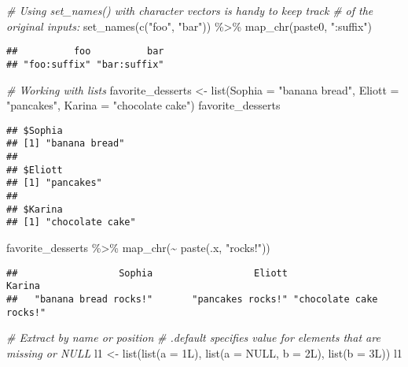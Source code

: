 \documentclass[
]{book}
\newenvironment{Shaded}{\begin{snugshade}}{\end{snugshade}}
\newcommand{\AttributeTok}[1]{\textcolor[rgb]{0.77,0.63,0.00}{#1}}
\newcommand{\CommentTok}[1]{\textcolor[rgb]{0.56,0.35,0.01}{\textit{#1}}}
\newcommand{\ConstantTok}[1]{\textcolor[rgb]{0.00,0.00,0.00}{#1}}
\newcommand{\FunctionTok}[1]{\textcolor[rgb]{0.00,0.00,0.00}{#1}}
\newcommand{\NormalTok}[1]{#1}
\newcommand{\OtherTok}[1]{\textcolor[rgb]{0.56,0.35,0.01}{#1}}
\newcommand{\SpecialCharTok}[1]{\textcolor[rgb]{0.00,0.00,0.00}{#1}}
\newcommand{\StringTok}[1]{\textcolor[rgb]{0.31,0.60,0.02}{#1}}
\begin{document}
\begin{Shaded}
\begin{Highlighting}[]
\CommentTok{\# Using set\_names() with character vectors is handy to keep track}
\CommentTok{\# of the original inputs:}
\FunctionTok{set\_names}\NormalTok{(}\FunctionTok{c}\NormalTok{(}\StringTok{"foo"}\NormalTok{, }\StringTok{"bar"}\NormalTok{)) }\SpecialCharTok{\%\textgreater{}\%} 
  \FunctionTok{map\_chr}\NormalTok{(paste0, }\StringTok{":suffix"}\NormalTok{)}
\end{Highlighting}
\end{Shaded}

\begin{verbatim}
##          foo          bar 
## "foo:suffix" "bar:suffix"
\end{verbatim}

\begin{Shaded}
\begin{Highlighting}[]
\CommentTok{\# Working with lists}
\NormalTok{favorite\_desserts }\OtherTok{\textless{}{-}} \FunctionTok{list}\NormalTok{(}\AttributeTok{Sophia =} \StringTok{"banana bread"}\NormalTok{, }\AttributeTok{Eliott =} \StringTok{"pancakes"}\NormalTok{, }\AttributeTok{Karina =} \StringTok{"chocolate cake"}\NormalTok{)}
\NormalTok{favorite\_desserts}
\end{Highlighting}
\end{Shaded}

\begin{verbatim}
## $Sophia
## [1] "banana bread"
## 
## $Eliott
## [1] "pancakes"
## 
## $Karina
## [1] "chocolate cake"
\end{verbatim}

\begin{Shaded}
\begin{Highlighting}[]
\NormalTok{favorite\_desserts }\SpecialCharTok{\%\textgreater{}\%} 
  \FunctionTok{map\_chr}\NormalTok{(}\SpecialCharTok{\textasciitilde{}} \FunctionTok{paste}\NormalTok{(.x, }\StringTok{"rocks!"}\NormalTok{))}
\end{Highlighting}
\end{Shaded}

\begin{verbatim}
##                  Sophia                  Eliott                  Karina 
##   "banana bread rocks!"       "pancakes rocks!" "chocolate cake rocks!"
\end{verbatim}

\begin{Shaded}
\begin{Highlighting}[]
\CommentTok{\# Extract by name or position}
\CommentTok{\# .default specifies value for elements that are missing or NULL}
\NormalTok{l1 }\OtherTok{\textless{}{-}} \FunctionTok{list}\NormalTok{(}\FunctionTok{list}\NormalTok{(}\AttributeTok{a =}\NormalTok{ 1L), }
           \FunctionTok{list}\NormalTok{(}\AttributeTok{a =} \ConstantTok{NULL}\NormalTok{, }\AttributeTok{b =}\NormalTok{ 2L), }
           \FunctionTok{list}\NormalTok{(}\AttributeTok{b =}\NormalTok{ 3L))}
\NormalTok{l1}
\end{Highlighting}
\end{Shaded}
\end{document}

